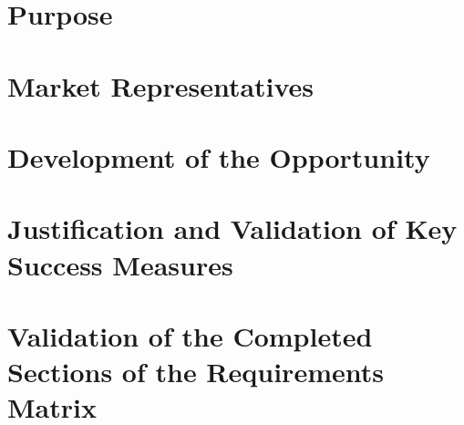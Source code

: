 \documentclass[]{auvsi_doc}
\begin{document}
\CapstoneTitlePage

\section{Purpose}
\section{Market Representatives}
\section{Development of the Opportunity}
\section{Justification and Validation of Key Success Measures}
\section{Validation of the Completed Sections of the Requirements Matrix}
\end{document}

